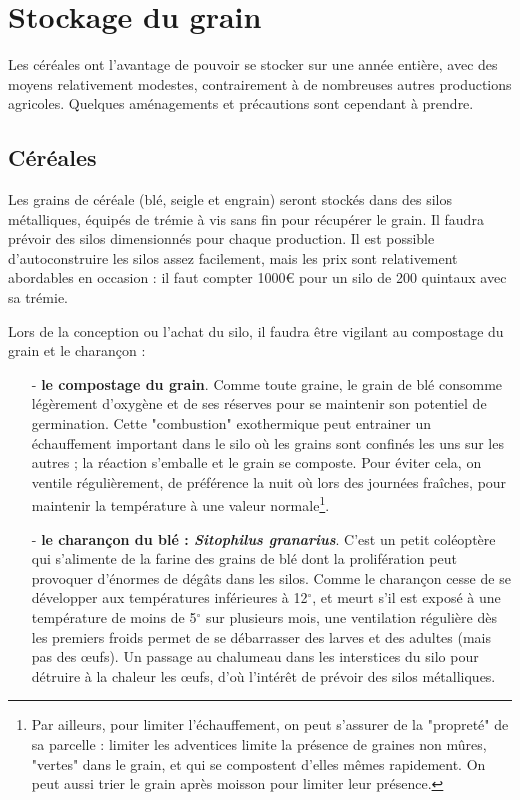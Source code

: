 \documentclass{book}
\begin{document}
\section{Stockage du grain}

Les céréales ont l'avantage de pouvoir se stocker sur une année entière, avec des moyens relativement modestes, contrairement à de nombreuses autres productions agricoles. Quelques aménagements et précautions sont cependant à prendre.

\subsection{Céréales}

Les grains de céréale (blé, seigle et engrain) seront stockés dans des silos métalliques, équipés de trémie à vis sans fin pour récupérer le grain. Il faudra prévoir des silos dimensionnés pour chaque production. Il est possible d'autoconstruire les silos assez facilement, mais les prix sont relativement abordables en occasion : il faut compter 1000\euro{} pour un silo de 200 quintaux avec sa trémie.

Lors de la conception ou l'achat du silo, il faudra être vigilant au compostage du grain et le charançon :

\begin{itemize}

	\item[-] \textbf{le compostage du grain}. Comme toute graine, le grain de blé consomme légèrement d'oxygène et de ses réserves pour se maintenir son potentiel de germination. Cette "combustion" exothermique peut entrainer un échauffement important dans le silo où les grains sont confinés les uns sur les autres ; la réaction s'emballe et le grain se composte. Pour éviter cela, on ventile régulièrement, de préférence la nuit où lors des journées fraîches, pour maintenir la température à une valeur normale\footnote{Par ailleurs, pour limiter l'échauffement, on peut s'assurer de la "propreté" de sa parcelle : limiter les adventices limite la présence de graines non mûres, "vertes" dans le grain, et qui se compostent d'elles mêmes rapidement. On peut aussi trier le grain après moisson pour limiter leur présence.}.
	
	\item[-] \textbf{le charançon du blé : \textit{Sitophilus granarius}}. C'est un petit coléoptère qui s'alimente de la farine des grains de blé dont la prolifération peut provoquer d'énormes de dégâts dans les silos. Comme le charançon cesse de se développer aux températures inférieures à 12$^\circ$, et meurt s'il est exposé à une température de moins de 5$^\circ$ sur plusieurs mois, une ventilation régulière dès les premiers froids permet de se débarrasser des larves et des adultes (mais pas des œufs). Un passage au chalumeau dans les interstices du silo pour détruire à la chaleur les œufs, d'où l'intérêt de prévoir des silos métalliques. 
	
\end{itemize}
\end{document}
